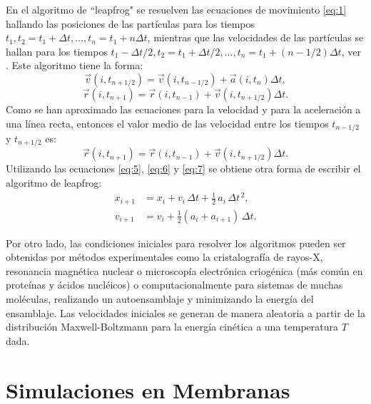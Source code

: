 En el algoritmo de ``leapfrog" se resuelven las ecuaciones de movimiento \eqref{eq:1} hallando las posiciones de las part\'{i}culas para los tiempos $t_1,t_2=t_1+\Delta t,...,t_n=t_{1}+n\Delta t$, mientras que las velocidades de las part\'{i}culas se hallan para los tiempos $t_1-\Delta t/2,t_2=t_1+\Delta t/2,...,t_n=t_{1}+(n-1/2)\Delta t$, ver \cite{Mazur1997CommonRevisited}.  Este algoritmo tiene la forma:
\begin{equation}\label{eq:5}
\vec{v}{(i,t_{n+1/2})}=\vec{v}{(i,t_{n-1/2})}+\vec{a}{(i,t_{n})}\Delta t,
\end{equation}
\begin{equation}\label{eq:6}
\vec{r}{(i,t_{n+1})}=\vec{r}{(i,t_{n-1})}+\vec{v}{(i,t_{n+1/2})}\Delta t.
\end{equation}
Como se han aproximado las ecuaciones para la velocidad y para la aceleraci\'{o}n a una l\'{i}nea recta, entonces el valor medio de las velocidad entre los tiempos $t_{n-1/2}$ y $t_{n+1/2}$ es:
\begin{equation}\label{eq:7}
\vec{r}{(i,t_{n+1})}=\vec{r}{(i,t_{n-1})}+\vec{v}{(i,t_{n+1/2})}\Delta t.
\end{equation}
Utilizando las ecuaciones \eqref{eq:5}, \eqref{eq:6} y \eqref{eq:7} se obtiene otra forma de escribir el algoritmo de leapfrog:
\begin{eqnarray}
  x_{i+1} &= x_i + v_i\, \Delta t + \tfrac{1}{2}\,a_i\, \Delta t^{\,2}, \\
  v_{i+1} &= v_i + \tfrac{1}{2}(a_i + a_{i+1})\,\Delta t.
\end{eqnarray}

Por otro lado, las condiciones iniciales para resolver los algoritmos pueden ser obtenidas por m\'{e}todos experimentales como la cristalograf\'{i}a de rayos-X, resonancia magn\'{e}tica nuclear o microscop\'{i}a electr\'{o}nica criog\'{e}nica (m\'{a}s com\'{u}n en prote\'{i}nas y \'{a}cidos nucl\'{e}icos) o computacionalmente para sistemas de muchas mol\'{e}culas, realizando un autoensamblaje y minimizando la energ\'{i}a del ensamblaje. Las velocidades iniciales se generan de manera aleatoria a partir de la distribuci\'{o}n Maxwell-Boltzmann para la energ\'{i}a cin\'{e}tica a una temperatura $T$ dada.\\
\section{Simulaciones en Membranas}\label{ss:smem}
